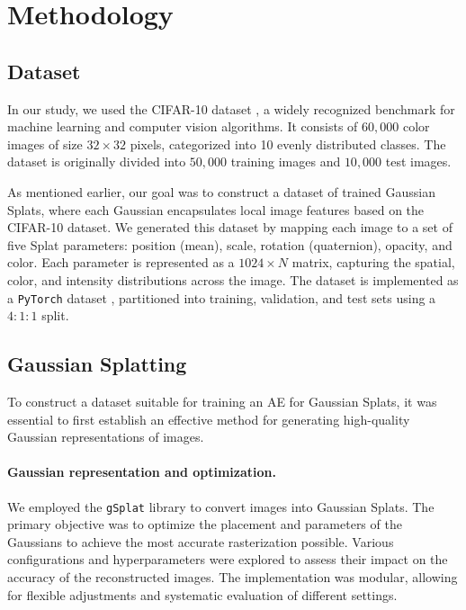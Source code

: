 \section{Methodology}
\label{sec:methodology}

\subsection{Dataset}
In our study, we used the CIFAR-10 dataset \cite{krizhevsky2009learningml}, a widely recognized benchmark for machine learning and computer vision algorithms. It consists of $60,000$ color images of size $32 \times 32$ pixels, categorized into 10 evenly distributed classes. The dataset is originally divided into $50,000$ training images and $10,000$ test images.

As mentioned earlier, our goal was to construct a dataset of trained Gaussian Splats, where each Gaussian encapsulates local image features based on the CIFAR-10 dataset. We generated this dataset by mapping each image to a set of five Splat parameters: position (mean), scale, rotation (quaternion), opacity, and color. Each parameter is represented as a $1024 \times N$ matrix, capturing the spatial, color, and intensity distributions across the image. The dataset is implemented as a \texttt{PyTorch} dataset \cite{paszke2019pytorchai}, partitioned into training, validation, and test sets using a $4 : 1 : 1$ split.

\subsection{Gaussian Splatting}
To construct a dataset suitable for training an AE for Gaussian Splats, it was essential to first establish an effective method for generating high-quality Gaussian representations of images.

\paragraph{Gaussian representation and optimization.}
We employed the \texttt{gSplat} library \cite{ye2024gSplatao} to convert images into Gaussian Splats. The primary objective was to optimize the placement and parameters of the Gaussians to achieve the most accurate rasterization possible. Various configurations and hyperparameters were explored to assess their impact on the accuracy of the reconstructed images. The implementation was modular, allowing for flexible adjustments and systematic evaluation of different settings. 

